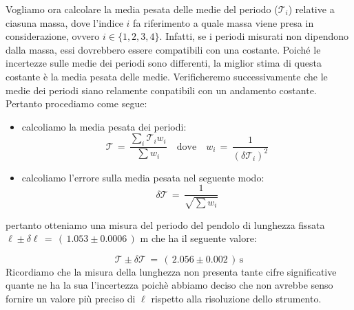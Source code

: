 Vogliamo ora calcolare la media pesata delle medie del periodo ($\mathcal{T}_i$) relative a ciasuna massa, dove l'indice $i$ fa riferimento a quale massa viene presa in considerazione, ovvero $i \in \{1,2,3,4\}$.
Infatti, se i periodi misurati non dipendono dalla massa, essi dovrebbero essere compatibili con una costante.
Poiché le incertezze sulle medie dei periodi sono differenti, la miglior stima di questa costante è la media pesata delle medie.
Verificheremo successivamente che le medie dei periodi siano relamente conpatibili con un andamento costante.
Pertanto procediamo come segue:

\begin{itemize}
	\item{calcoliamo la media pesata dei periodi:
			\begin{equation*}
				\mathcal{T} \,=\, \frac{\sum_i \mathcal{T}_i w_i}{\sum w_i} \quad \text{dove} \quad w_i \,=\, \frac{1}{(\delta \mathcal{T}_i)^2}
			\end{equation*}
			}
	\item{calcoliamo l'errore sulla media pesata nel seguente modo:
			\begin{equation*}
				\delta \mathcal{T} \,=\, \frac{1}{\sqrt{\sum w_i}}
			\end{equation*}
			}
\end{itemize}
pertanto otteniamo una misura del periodo del pendolo di lunghezza fissata $\ell \pm \delta \ell \,=\, (\,1.053 \pm 0.0006\,)$ m che ha il seguente valore:

\begin{equation*}
	\mathcal{T} \pm \delta \mathcal{T} \,=\, (\,2.056 \pm 0.002\,) \, \text{s}
\end{equation*}
%
Ricordiamo che la misura della lunghezza non presenta tante cifre significative quante ne ha la sua l'incertezza poichè abbiamo deciso che non avrebbe senso fornire un valore più preciso di $\ell$ rispetto alla risoluzione dello strumento.
